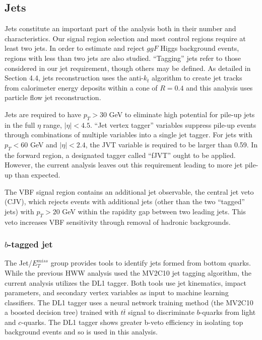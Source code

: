 \subsection{Jets}

Jets constitute an important part of the analysis both in their number and characteristics. Our signal region selection and most control regions require at least two jets. In order to estimate and reject $ggF$ Higgs background events, regions with less than two jets are also studied. ``Tagging'' jets refer to those considered in our jet requirement, though others may be defined. As detailed in Section 4.4, jets reconstruction uses the anti-$k_t$ algorithm to create jet tracks from calorimeter energy deposits within a cone of $R = 0.4$ and this analysis uses particle flow jet reconstruction.   

Jets are required to have $p_T > 30$ GeV to eliminate high potential for pile-up jets in the full $\eta$ range, $|\eta| < 4.5$. ``Jet vertex tagger'' variables suppress pile-up events through combinations of multiple variables into a single jet tagger. For jets with $p_T < 60$ GeV and $|\eta| < 2.4$, the JVT variable is required to be larger than 0.59. In the forward region, a designated tagger called ``fJVT'' ought to be applied. However, the current analysis leaves out this requirement leading to more jet pile-up than expected. 

The VBF signal region contains an additional jet observable, the central jet veto (CJV), which rejects events with additional jets (other than the two ``tagged'' jets) with $p_T>20$ GeV within the rapidity gap between two leading jets. This veto increases VBF sensitivity through removal of hadronic backgrounds.
\subsubsection{$b$-tagged jet}

The Jet/$E_T^{miss}$ group provides tools to identify jets formed from bottom quarks. While the previous HWW analysis \cite{Aaboud_2019} used the MV2C10 jet tagging algorithm, the current analysis utilizes the DL1 tagger. Both tools use jet kinematics, impact parameters, and secondary vertex variables as input to machine learning classifiers. The DL1 tagger uses a neural network training method (the MV2C10 a boosted decision tree) trained with $t\bar{t}$ signal to discriminate $b$-quarks from light and $c$-quarks. The DL1 tagger shows greater b-veto efficiency in isolating top background events and so is used in this analysis. 

